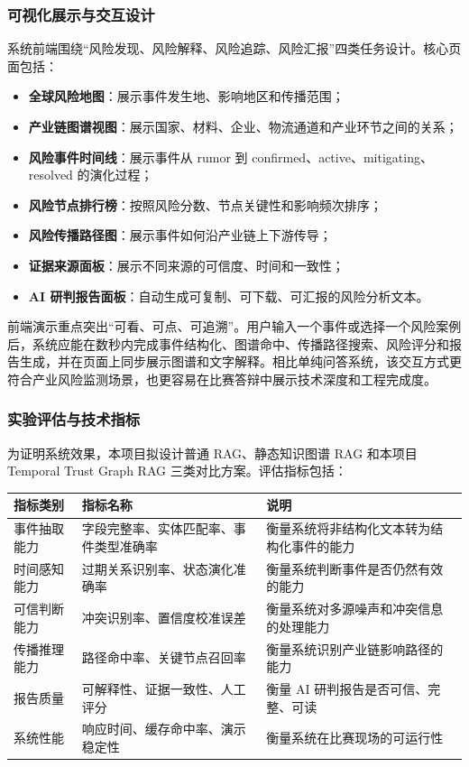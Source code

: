 \documentclass[12pt,a4paper]{article}
\newcommand{\term}[1]{\textbf{#1}}
\begin{document}
\subsubsection{可视化展示与交互设计}

系统前端围绕“风险发现、风险解释、风险追踪、风险汇报”四类任务设计。核心页面包括：
\begin{itemize}
    \item \term{全球风险地图}：展示事件发生地、影响地区和传播范围；
    \item \term{产业链图谱视图}：展示国家、材料、企业、物流通道和产业环节之间的关系；
    \item \term{风险事件时间线}：展示事件从 rumor 到 confirmed、active、mitigating、resolved 的演化过程；
    \item \term{风险节点排行榜}：按照风险分数、节点关键性和影响频次排序；
    \item \term{风险传播路径图}：展示事件如何沿产业链上下游传导；
    \item \term{证据来源面板}：展示不同来源的可信度、时间和一致性；
    \item \term{AI 研判报告面板}：自动生成可复制、可下载、可汇报的风险分析文本。
\end{itemize}

前端演示重点突出“可看、可点、可追溯”。用户输入一个事件或选择一个风险案例后，系统应能在数秒内完成事件结构化、图谱命中、传播路径搜索、风险评分和报告生成，并在页面上同步展示图谱和文字解释。相比单纯问答系统，该交互方式更符合产业风险监测场景，也更容易在比赛答辩中展示技术深度和工程完成度。

\subsubsection{实验评估与技术指标}

为证明系统效果，本项目拟设计普通 RAG、静态知识图谱 RAG 和本项目 Temporal Trust Graph RAG 三类对比方案。评估指标包括：
\begin{center}
\begin{tabularx}{0.95\linewidth}{>{\raggedright\arraybackslash}p{3.2cm} >{\raggedright\arraybackslash}p{3.6cm} >{\raggedright\arraybackslash}X}
\toprule
指标类别 & 指标名称 & 说明 \\
\midrule
事件抽取能力 & 字段完整率、实体匹配率、事件类型准确率 & 衡量系统将非结构化文本转为结构化事件的能力 \\
时间感知能力 & 过期关系识别率、状态演化准确率 & 衡量系统判断事件是否仍然有效的能力 \\
可信判断能力 & 冲突识别率、置信度校准误差 & 衡量系统对多源噪声和冲突信息的处理能力 \\
传播推理能力 & 路径命中率、关键节点召回率 & 衡量系统识别产业链影响路径的能力 \\
报告质量 & 可解释性、证据一致性、人工评分 & 衡量 AI 研判报告是否可信、完整、可读 \\
系统性能 & 响应时间、缓存命中率、演示稳定性 & 衡量系统在比赛现场的可运行性 \\
\bottomrule
\end{tabularx}
\end{center}
\end{document}

